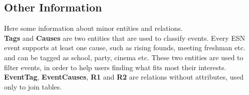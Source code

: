 \subsection{Other Information}

Here some information about minor entities and relations.\\
\textbf{Tags} and \textbf{Causes} are two entities that are used to classify events. Every ESN event
supports at least one cause, such as rising founds, meeting freshman etc.
and can be tagged as school, party, cinema etc. These two entities are used to filter events, in order to help users finding what fits most their interests.\\
\textbf{EventTag}, \textbf{EventCauses}, \textbf{R1} and \textbf{R2} are relations without attributes, used
only to join tables.